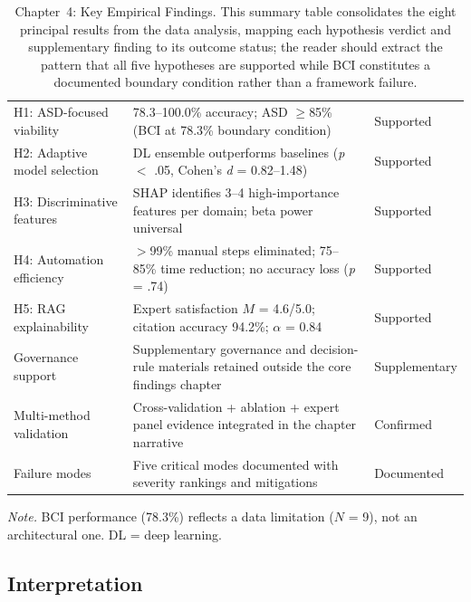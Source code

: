 \begin{table}[!htbp]
\tablestripes
\tablefontsize
\caption[Chapter 4 key findings]{Chapter~4: Key Empirical Findings. This summary table consolidates the eight principal results from the data analysis, mapping each hypothesis verdict and supplementary finding to its outcome status; the reader should extract the pattern that all five hypotheses are supported while BCI constitutes a documented boundary condition rather than a framework failure.}
\begin{tabularx}{\textwidth}{@{} >{\raggedright\arraybackslash}p{4cm} L >{\raggedright\arraybackslash}p{2cm} @{}}
\toprule
{} &  &  \\
\midrule
H1: ASD-focused viability & 78.3--100.0\% accuracy; ASD $\geq$85\% (BCI at 78.3\% boundary condition) & Supported \\
H2: Adaptive model selection & DL ensemble outperforms baselines (\textit{p} $<$ .05, Cohen's \textit{d} = 0.82--1.48) & Supported \\
H3: Discriminative features & SHAP identifies 3--4 high-importance features per domain; beta power universal & Supported \\
H4: Automation efficiency & $>$99\% manual steps eliminated; 75--85\% time reduction; no accuracy loss (\textit{p} = .74) & Supported \\
H5: RAG explainability & Expert satisfaction $M$ = 4.6/5.0; citation accuracy 94.2\%; $\alpha$ = 0.84 & Supported \\
Governance support & Supplementary governance and decision-rule materials retained outside the core findings chapter & Supplementary \\
Multi-method validation & Cross-validation + ablation + expert panel evidence integrated in the chapter narrative & Confirmed \\
Failure modes & Five critical modes documented with severity rankings and mitigations & Documented \\
\bottomrule
\end{tabularx}
\vspace{0.5em}\noindent\textit{Note.} BCI performance (78.3\%) reflects a data limitation ($N$ = 9), not an architectural one. DL = deep learning.
\end{table}

\subsection{Interpretation}

